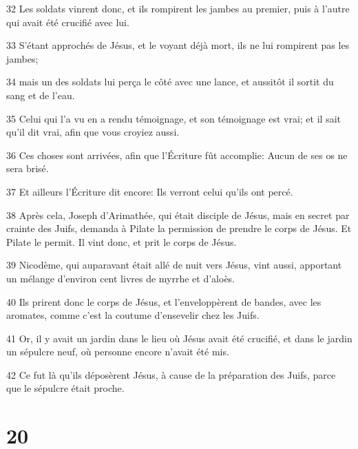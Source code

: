 \par 32 Les soldats vinrent donc, et ils rompirent les jambes au premier, puis à l'autre qui avait été crucifié avec lui.
\par 33 S'étant approchés de Jésus, et le voyant déjà mort, ils ne lui rompirent pas les jambes;
\par 34 mais un des soldats lui perça le côté avec une lance, et aussitôt il sortit du sang et de l'eau.
\par 35 Celui qui l'a vu en a rendu témoignage, et son témoignage est vrai; et il sait qu'il dit vrai, afin que vous croyiez aussi.
\par 36 Ces choses sont arrivées, afin que l'Écriture fût accomplie: Aucun de ses os ne sera brisé.
\par 37 Et ailleurs l'Écriture dit encore: Ils verront celui qu'ils ont percé.
\par 38 Après cela, Joseph d'Arimathée, qui était disciple de Jésus, mais en secret par crainte des Juifs, demanda à Pilate la permission de prendre le corps de Jésus. Et Pilate le permit. Il vint donc, et prit le corps de Jésus.
\par 39 Nicodème, qui auparavant était allé de nuit vers Jésus, vint aussi, apportant un mélange d'environ cent livres de myrrhe et d'aloès.
\par 40 Ils prirent donc le corps de Jésus, et l'enveloppèrent de bandes, avec les aromates, comme c'est la coutume d'ensevelir chez les Juifs.
\par 41 Or, il y avait un jardin dans le lieu où Jésus avait été crucifié, et dans le jardin un sépulcre neuf, où personne encore n'avait été mis.
\par 42 Ce fut là qu'ils déposèrent Jésus, à cause de la préparation des Juifs, parce que le sépulcre était proche.

\chapter{20}

